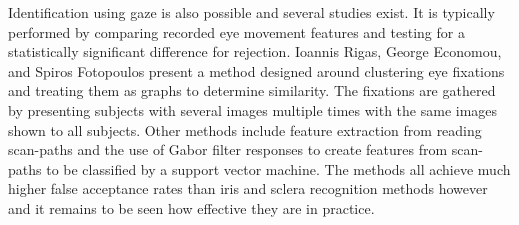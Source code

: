 Identification using gaze is also possible and several studies exist. It is typically performed by comparing recorded eye movement features and testing for a statistically significant difference for rejection. Ioannis Rigas, George Economou, and Spiros Fotopoulos \parencite{rigasBiometricIdentificationBased2012} present a method designed around clustering eye fixations and treating them as graphs to determine similarity. The fixations are gathered by presenting subjects with several images multiple times with the same images shown to all subjects. Other methods include feature extraction from reading scan-paths \parencite{hollandBiometricIdentificationEye2011, bednarikEyeMovementsBiometric2005} and the use of Gabor filter responses to create features from scan-paths to be classified by a support vector machine\parencite{liBiometricRecognitionTexture2018}. The methods all achieve much higher false acceptance rates than iris and sclera recognition methods however and it remains to be seen how effective they are in practice.









